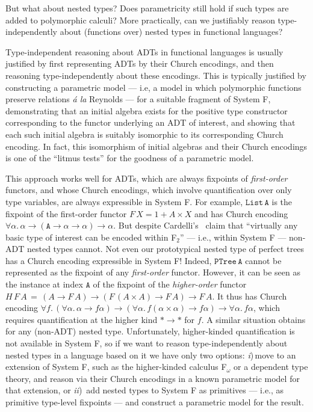 \documentclass[runningheads]{llncs}
\begin{document}
But what about nested types? Does parametricity still hold if such
types are added to polymorphic calculi? More practically, can we
justifiably reason type-independently about (functions over) nested
types in functional languages?

Type-independent reasoning about ADTs in functional languages is
usually justified by first representing ADTs by their Church
encodings, and then reasoning type-independently about these
encodings. This is typically justified by constructing a parametric
model --- i.e, a model in which polymorphic functions preserve
relations {\em \'a la} Reynolds --- for a suitable fragment of System
F, demonstrating that an initial algebra exists for the positive type
constructor corresponding to the functor underlying an ADT of
interest, and showing that each such initial algebra is suitably
isomorphic to its corresponding Church encoding. In fact, this
isomorphism of initial algebras and their Church encodings is one of
the ``litmus tests'' for the goodness of a parametric model.

This approach works well for ADTs, which are always fixpoints of {\em
  first-order} functors, and whose Church encodings, which involve
quantification over only type variables, are always expressible in
System F. For example, $\mathtt{List\,A}$ is the fixpoint of the
first-order functor $F\,X = 1 + A \times X$ and has Church encoding
$\forall \alpha. \, \alpha \to (\mathtt{A} \to \alpha \to \alpha) \to
\alpha$. But despite Cardelli's~\cite{car97} claim that ``virtually
any basic type of interest can be encoded within F$_2$'' --- i.e.,
within System F --- non-ADT nested types cannot.  Not even our
prototypical nested type of perfect trees has a Church encoding
expressible in System F!  Indeed, $\mathtt{PTree\,A}$ cannot be
represented as the fixpoint of any {\em first-order} functor. However,
it can be seen as the instance at index $\mathtt{A}$ of the fixpoint
of the {\em higher-order} functor $H\,F\,A\,=\, (A \to F\,A) \to (F
\,(A \times A) \to F\,A) \to F\,A$. It thus has Church encoding
$\forall f.\, (\forall \alpha.\,\alpha \to f\alpha) \to (\forall
\alpha. \,f (\alpha \times \alpha) \to f\alpha) \to \forall \alpha.\,
f\alpha$, which requires quantification at the higher kind $* \to *$
for $f$. A similar situation obtains for any (non-ADT) nested
type. Unfortunately, higher-kinded quantification is not available in
System F, so if we want to reason type-independently about nested
types in a language based on it we have only two options: {\em
  i})\,move to an extension of System F, such as the higher-kinded
calculus F$_\omega$ or a dependent type theory, and reason via their
Church encodings in a known parametric model for that extension, or
{\em ii})\, add nested types to System F as primitives --- i.e., as
primitive type-level fixpoints --- and construct a parametric model
for the result.
\end{document}
